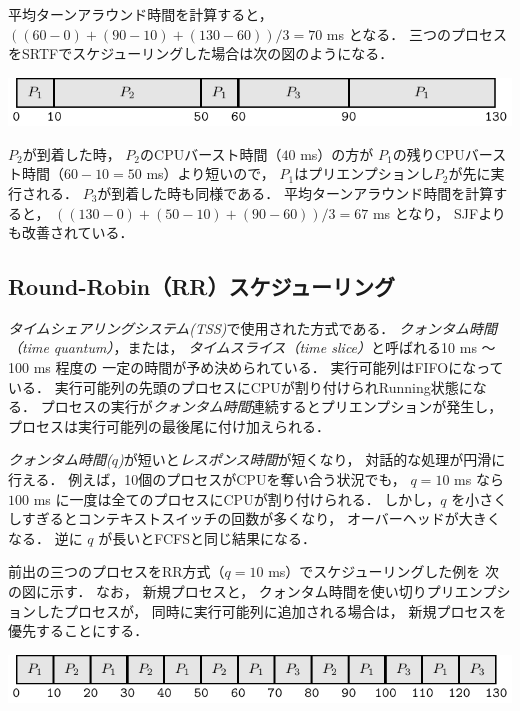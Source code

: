 平均ターンアラウンド時間を計算すると，
$((60-0)+(90-10)+(130-60))/3=70$ ms となる．
三つのプロセスをSRTFでスケジューリングした場合は次の図のようになる．

\begin{center}
  \includegraphics[scale=1.0]{GanntChart/srtf1.pdf}
\end{center}

$P_2$が到着した時，
$P_2$のCPUバースト時間（$40$ ms）の方が
$P_1$の残りCPUバースト時間（$60 - 10 = 50$ ms）より短いので，
$P_1$はプリエンプションし$P_2$が先に実行される．
$P_3$が到着した時も同様である．
平均ターンアラウンド時間を計算すると，
$((130-0)+(50-10)+(90-60))/3=67$ ms となり，
SJFよりも改善されている．

\subsection{Round-Robin（RR）スケジューリング}
\emph{タイムシェアリングシステム(TSS)}で使用された方式である．
\emph{クォンタム時間（time quantum）}，または，
\emph{タイムスライス（time slice）}と呼ばれる10 ms 〜 100 ms 程度の
一定の時間が予め決められている．
実行可能列はFIFOになっている．
実行可能列の先頭のプロセスにCPUが割り付けられRunning状態になる．
プロセスの実行が\emph{クォンタム時間}連続するとプリエンプションが発生し，
プロセスは実行可能列の最後尾に付け加えられる．

\emph{クォンタム時間($q$)}が短いと\emph{レスポンス時間}が短くなり，
対話的な処理が円滑に行える．
例えば，10個のプロセスがCPUを奪い合う状況でも，
$q = 10$ ms なら$100$ ms に一度は全てのプロセスにCPUが割り付けられる．
しかし，$q$ を小さくしすぎるとコンテキストスイッチの回数が多くなり，
オーバーヘッドが大きくなる．
逆に $q$ が長いとFCFSと同じ結果になる．

前出の三つのプロセスをRR方式（$q = 10$ ms）でスケジューリングした例を
次の図に示す．
なお，
新規プロセスと，
クォンタム時間を使い切りプリエンプションしたプロセスが，
同時に実行可能列に追加される場合は，
新規プロセスを優先することにする．

\begin{center}
  \includegraphics[scale=1.0]{GanntChart/rr1.pdf}
\end{center}


